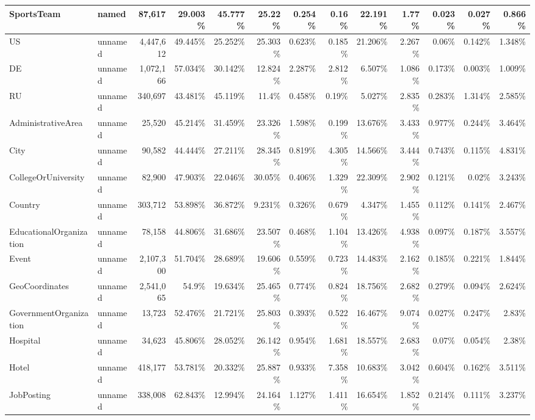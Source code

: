 \begin{table}[t]
{\begin{tabular}{llrrrrrrrrrrr}
SportsTeam & named & 87{,}617 & 29.003\% & 45.777\% & 25.22\% & 0.254\% & 0.16\% & 22.191\% & 1.77\% & 0.023\% & 0.027\% & 0.866\% \\
\midrule
US & unnamed & 4{,}447{,}612 & 49.445\% & 25.252\% & 25.303\% & 0.623\% & 0.185\% & 21.206\% & 2.267\% & 0.06\% & 0.142\% & 1.348\% \\
DE & unnamed & 1{,}072{,}166 & 57.034\% & 30.142\% & 12.824\% & 2.287\% & 2.812\% & 6.507\% & 1.086\% & 0.173\% & 0.003\% & 1.009\% \\
RU & unnamed & 340{,}697 & 43.481\% & 45.119\% & 11.4\% & 0.458\% & 0.19\% & 5.027\% & 2.835\% & 0.283\% & 1.314\% & 2.585\% \\
\midrule
AdministrativeArea & unnamed & 25{,}520 & 45.214\% & 31.459\% & 23.326\% & 1.598\% & 0.199\% & 13.676\% & 3.433\% & 0.977\% & 0.244\% & 3.464\% \\
City & unnamed & 90{,}582 & 44.444\% & 27.211\% & 28.345\% & 0.819\% & 4.305\% & 14.566\% & 3.444\% & 0.743\% & 0.115\% & 4.831\% \\
CollegeOrUniversity & unnamed & 82{,}900 & 47.903\% & 22.046\% & 30.05\% & 0.406\% & 1.329\% & 22.309\% & 2.902\% & 0.121\% & 0.02\% & 3.243\% \\
Country & unnamed & 303{,}712 & 53.898\% & 36.872\% & 9.231\% & 0.326\% & 0.679\% & 4.347\% & 1.455\% & 0.112\% & 0.141\% & 2.467\% \\
EducationalOrganization & unnamed & 78{,}158 & 44.806\% & 31.686\% & 23.507\% & 0.468\% & 1.104\% & 13.426\% & 4.938\% & 0.097\% & 0.187\% & 3.557\% \\
Event & unnamed & 2{,}107{,}300 & 51.704\% & 28.689\% & 19.606\% & 0.559\% & 0.723\% & 14.483\% & 2.162\% & 0.185\% & 0.221\% & 1.844\% \\
GeoCoordinates & unnamed & 2{,}541{,}065 & 54.9\% & 19.634\% & 25.465\% & 0.774\% & 0.824\% & 18.756\% & 2.682\% & 0.279\% & 0.094\% & 2.624\% \\
GovernmentOrganization & unnamed & 13{,}723 & 52.476\% & 21.721\% & 25.803\% & 0.393\% & 0.522\% & 16.467\% & 9.074\% & 0.027\% & 0.247\% & 2.83\% \\
Hospital & unnamed & 34{,}623 & 45.806\% & 28.052\% & 26.142\% & 0.954\% & 1.681\% & 18.557\% & 2.683\% & 0.07\% & 0.054\% & 2.38\% \\
Hotel & unnamed & 418{,}177 & 53.781\% & 20.332\% & 25.887\% & 0.933\% & 7.358\% & 10.683\% & 3.042\% & 0.604\% & 0.162\% & 3.511\% \\
JobPosting & unnamed & 338{,}008 & 62.843\% & 12.994\% & 24.164\% & 1.127\% & 1.411\% & 16.654\% & 1.852\% & 0.214\% & 0.111\% & 3.237\% \\

\end{tabular}}
\end{table}
